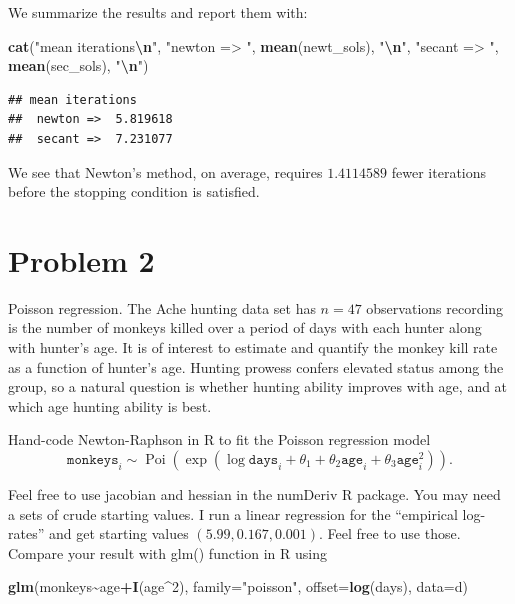 \documentclass[
]{article}
\newenvironment{Shaded}{\begin{snugshade}}{\end{snugshade}}
\newcommand{\AttributeTok}[1]{\textcolor[rgb]{0.13,0.29,0.53}{#1}}
\newcommand{\DecValTok}[1]{\textcolor[rgb]{0.00,0.00,0.81}{#1}}
\newcommand{\FunctionTok}[1]{\textcolor[rgb]{0.13,0.29,0.53}{\textbf{#1}}}
\newcommand{\NormalTok}[1]{#1}
\newcommand{\SpecialCharTok}[1]{\textcolor[rgb]{0.81,0.36,0.00}{\textbf{#1}}}
\newcommand{\StringTok}[1]{\textcolor[rgb]{0.31,0.60,0.02}{#1}}
\begin{document}
We summarize the results and report them with:

\begin{Shaded}
\begin{Highlighting}[]
\FunctionTok{cat}\NormalTok{(}\StringTok{"mean iterations}\SpecialCharTok{\textbackslash{}n}\StringTok{"}\NormalTok{,}
    \StringTok{"newton =\textgreater{} "}\NormalTok{, }\FunctionTok{mean}\NormalTok{(newt\_sols), }\StringTok{"}\SpecialCharTok{\textbackslash{}n}\StringTok{"}\NormalTok{,}
    \StringTok{"secant =\textgreater{} "}\NormalTok{, }\FunctionTok{mean}\NormalTok{(sec\_sols), }\StringTok{"}\SpecialCharTok{\textbackslash{}n}\StringTok{"}\NormalTok{)}
\end{Highlighting}
\end{Shaded}

\begin{verbatim}
## mean iterations
##  newton =>  5.819618 
##  secant =>  7.231077
\end{verbatim}

We see that Newton's method, on average, requires \(1.4114589\) fewer
iterations before the stopping condition is satisfied.

\hypertarget{problem-2}{%
\section{Problem 2}\label{problem-2}}

Poisson regression. The Ache hunting data set has \(n = 47\)
observations recording is the number of monkeys killed over a period of
days with each hunter along with hunter's age. It is of interest to
estimate and quantify the monkey kill rate as a function of hunter's
age. Hunting prowess confers elevated status among the group, so a
natural question is whether hunting ability improves with age, and at
which age hunting ability is best.

Hand-code Newton-Raphson in R to fit the Poisson regression model \[
  \texttt{monkeys}_i \sim \operatorname{Poi}\left(\exp(\log \texttt{days}_i  + \theta_1 + \theta_2 \texttt{age}_i + \theta_3 \texttt{age}_i^2)\right).
\]

Feel free to use jacobian and hessian in the numDeriv R package. You may
need a sets of crude starting values. I run a linear regression for the
``empirical log-rates'' and get starting values
\((5.99, 0.167, 0.001)\). Feel free to use those. Compare your result
with glm() function in R using

\begin{Shaded}
\begin{Highlighting}[]
\FunctionTok{glm}\NormalTok{(monkeys}\SpecialCharTok{\textasciitilde{}}\NormalTok{age}\SpecialCharTok{+}\FunctionTok{I}\NormalTok{(age}\SpecialCharTok{\^{}}\DecValTok{2}\NormalTok{), }\AttributeTok{family=}\StringTok{"poisson"}\NormalTok{, }\AttributeTok{offset=}\FunctionTok{log}\NormalTok{(days), }\AttributeTok{data=}\NormalTok{d)}
\end{Highlighting}
\end{Shaded}
\end{document}
